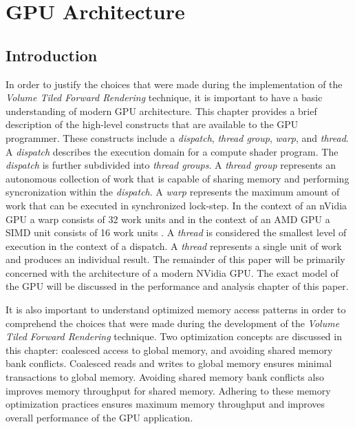 
\chapter{GPU Architecture} %
\label{ch:GPUArchitecture}

\section{Introduction}

In order to justify the choices that were made during the implementation of the \emph{Volume Tiled Forward Rendering} technique, it is important to have a basic understanding of modern GPU architecture. This chapter provides a brief description of the high-level constructs that are available to the GPU programmer. These constructs include a \emph{dispatch}, \emph{thread group}, \emph{warp}, and \emph{thread}. A \emph{dispatch} describes the execution domain for a compute shader program. The \emph{dispatch} is further subdivided into \emph{thread groups}. A \emph{thread group} represents an autonomous collection of work that is capable of sharing memory and performing syncronization within the \emph{dispatch}. A \emph{warp} represents the maximum amount of work that can be executed in synchronized lock-step. In the context of an nVidia GPU a warp consists of 32 work units \parencite{28_cuda_programming_guide_2016} and in the context of an AMD GPU a SIMD unit consists of 16 work units \parencite{44_amd_gcn_architecture_2012}. A \emph{thread} is considered the smallest level of execution in the context of a dispatch. A \emph{thread} represents a single unit of work and produces an individual result. The remainder of this paper will be primarily concerned with the architecture of a modern NVidia GPU. The exact model of the GPU will be discussed in the performance and analysis chapter of this paper.

It is also important to understand optimized memory access patterns in order to comprehend the choices that were made during the development of the \emph{Volume Tiled Forward Rendering} technique. Two optimization concepts are discussed in this chapter: coalesced access to global memory, and avoiding shared memory bank conflicts. Coalesced reads and writes to global memory ensures minimal transactions to global memory. Avoiding shared memory bank conflicts also improves memory throughput for shared memory. Adhering to these memory optimization practices ensures maximum memory throughput and improves overall performance of the GPU application. 

